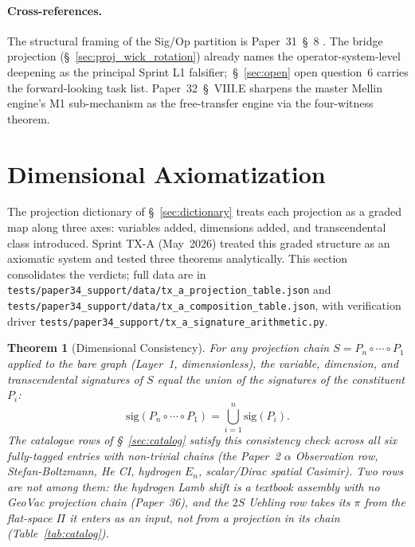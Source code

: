 \documentclass[11pt]{article}
\newtheorem{theorem}{Theorem}
\begin{document}
\paragraph{Cross-references.}
The structural framing of the Sig/Op partition is Paper~31~\S~8
\cite{paper31}.  The bridge projection (\S~\ref{sec:proj_wick_rotation})
already names the operator-system-level deepening as the principal
Sprint L1 falsifier;\ \S~\ref{sec:open} open question~6 carries the
forward-looking task list.  Paper~32~\S~VIII.E sharpens the master
Mellin engine's M1 sub-mechanism as the free-transfer engine via the
four-witness theorem.

\section{Dimensional Axiomatization}
\label{sec:axiomatization}

The projection dictionary of \S~\ref{sec:dictionary} treats each
projection as a graded map along three axes: variables added,
dimensions added, and transcendental class introduced.  Sprint TX-A
(May~2026) treated this graded structure as an axiomatic system and
tested three theorems analytically.  This section consolidates the
verdicts; full data are in
\texttt{tests/paper34\_support/data/tx\_a\_projection\_table.json} and
\texttt{tests/paper34\_support/data/tx\_a\_composition\_table.json}, with
verification driver
\texttt{tests/paper34\_support/tx\_a\_signature\_arithmetic.py}.

\begin{theorem}[Dimensional Consistency]
\label{thm:dimensional_consistency}
For any projection chain $S = P_n \circ \cdots \circ P_1$ applied to
the bare graph (Layer~1, dimensionless), the variable, dimension, and
transcendental signatures of $S$ equal the union of the signatures of
the constituent $P_i$:
\[
  \mathrm{sig}(P_n \circ \cdots \circ P_1)
   = \bigcup_{i=1}^{n} \mathrm{sig}(P_i).
\]
The catalogue rows of \S~\ref{sec:catalog} satisfy this consistency
check across all six fully-tagged entries with non-trivial chains
(the Paper~2 $\alpha$ Observation row, Stefan-Boltzmann, He CI,
hydrogen $E_n$, scalar/Dirac spatial Casimir).  Two rows are not among
them: the hydrogen Lamb shift is a textbook assembly with no GeoVac
projection chain (Paper~36), and the $2S$ Uehling row takes its $\pi$
from the flat-space $\Pi$ it enters as an input, not from a projection
in its chain (Table~\ref{tab:catalog}).
\end{theorem}
\end{document}
